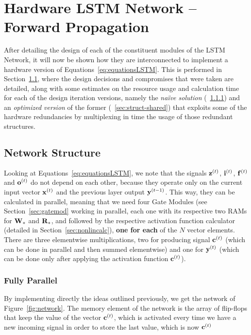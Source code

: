 \section{Hardware LSTM Network -- Forward Propagation}\label{sec:hLSTM-fp}
After detailing the design of each of the constituent modules of the LSTM Network, it will now be shown how they are interconnected
to implement a hardware version of Equations~\ref{eq:equationsLSTM}. This is performed in Section~\ref{sec:hLSTM-struct}, where the design decisions
and compromises that were taken are detailed, along with some estimates on the resource usage and calculation time for each of the design iteration versions, namely
the \textit{naïve solution} (~\ref{sec:struct-fullpar}) and an \textit{optimized version} of the former (~\ref{sec:struct-shared}) that exploits some
of the hardware redundancies by multiplexing in time the usage of those redundant structures.

\subsection{Network Structure}\label{sec:hLSTM-struct}
Looking at Equations~\ref{eq:equationsLSTM}, we note that the signals $\mathbf{z}^{(t)}$, $\mathbf{i}^{(t)}$, $\mathbf{f}^{(t)}$ and $\mathbf{o}^{(t)}$ do not depend on each other, because
they operate only on the current input vector $\mathbf{x}^{(t)}$ and the previous layer output $\mathbf{y}^{(t-1)}$. This way, they can be calculated in parallel, meaning that we need
four Gate Modules (see Section~\ref{sec:gatemod} working in parallel, each one with its respective two RAMs for $\mathbf{W}_*$ and $\mathbf{R}_*$, and followed by the respective activation
function calculator (detailed in Section~\ref{sec:nonlincalc}), \textbf{one for each} of the $N$ vector elements. There are three elementwise multiplications, two for producing
signal $\mathbf{c}^{(t)}$ (which can be done in parallel and then summed elementwise) and one for $\mathbf{y}^{(t)}$ (which can be done only after applying the activation function $\mathbf{c}^{(t)}$).

\subsubsection{Fully Parallel}\label{sec:struct-fullpar}
By implementing directly the ideas outlined previously, we get the network of Figure~\ref{fig:network}. The memory element of the network is the array of flip-flops that
keep the value of the vector $\mathbf{c}^{(t)}$, which is activated every time we have a new incoming signal in order to store the last value, which is now $\mathbf{c}^{(t)}$


